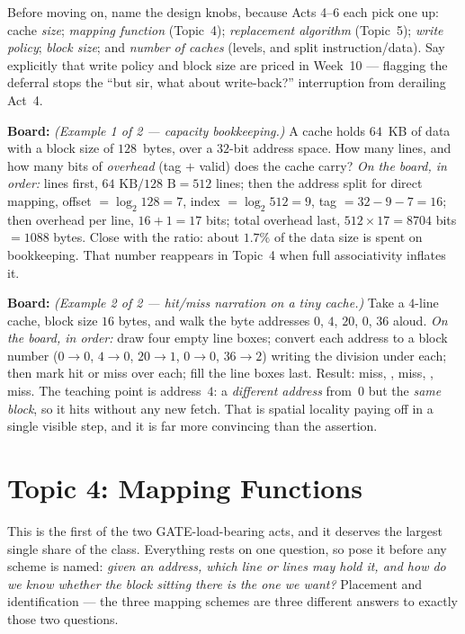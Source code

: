 \documentclass[11pt]{article}
\begin{document}
Before moving on, name the design knobs, because Acts 4--6 each pick one up: cache \emph{size}; \emph{mapping function} (Topic~4); \emph{replacement algorithm} (Topic~5); \emph{write policy}; \emph{block size}; and \emph{number of caches} (levels, and split instruction/data). Say explicitly that write policy and block size are priced in Week~10 --- flagging the deferral stops the ``but sir, what about write-back?'' interruption from derailing Act~4.

\textbf{Board:} \textit{(Example 1 of 2 --- capacity bookkeeping.)} A cache holds $64$~KB of data with a block size of $128$~bytes, over a $32$-bit address space. How many lines, and how many bits of \emph{overhead} (tag $+$ valid) does the cache carry? \emph{On the board, in order:} lines first, $64\text{ KB}/128\text{ B} = 512$ lines; then the address split for direct mapping, offset $= \log_2 128 = 7$, index $= \log_2 512 = 9$, tag $= 32 - 9 - 7 = 16$; then overhead per line, $16 + 1 = 17$ bits; total overhead last, $512 \times 17 = 8704$ bits $= 1088$ bytes. Close with the ratio: about $1.7\%$ of the data size is spent on bookkeeping. That number reappears in Topic~4 when full associativity inflates it.

\textbf{Board:} \textit{(Example 2 of 2 --- hit/miss narration on a tiny cache.)} Take a $4$-line cache, block size $16$ bytes, and walk the byte addresses $0$, $4$, $20$, $0$, $36$ aloud. \emph{On the board, in order:} draw four empty line boxes; convert each address to a block number ($0\to0$, $4\to0$, $20\to1$, $0\to0$, $36\to2$) writing the division under each; then mark hit or miss over each; fill the line boxes last. Result: miss, , miss, , miss. The teaching point is address~$4$: a \emph{different address} from~$0$ but the \emph{same block}, so it hits without any new fetch. That is spatial locality paying off in a single visible step, and it is far more convincing than the assertion.

\section{Topic 4: Mapping Functions}

This is the first of the two GATE-load-bearing acts, and it deserves the largest single share of the class. Everything rests on one question, so pose it before any scheme is named: \emph{given an address, which line or lines may hold it, and how do we know whether the block sitting there is the one we want?} Placement and identification --- the three mapping schemes are three different answers to exactly those two questions.
\end{document}
